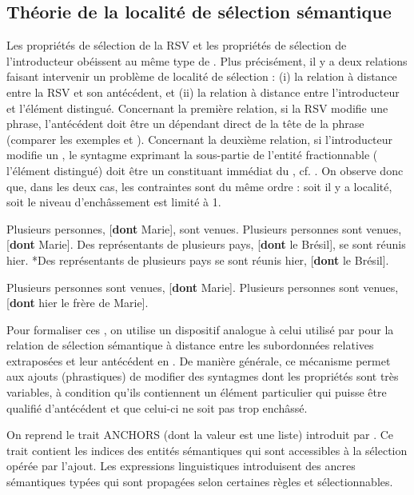 \subsection{Théorie de la localité de sélection sémantique}\label{ch3:sect3.5.4}

Les propriétés de sélection de la RSV et les propriétés de sélection de l’introducteur obéissent au même type de . Plus précisément, il y a deux relations faisant intervenir un problème de localité de sélection : (i) la relation à distance entre la RSV et son antécédent, et (ii) la relation à distance entre l’introducteur et l’élément distingué. Concernant la première relation, si la RSV modifie une phrase, l’antécédent doit être un dépendant direct de la tête de la phrase (comparer les exemples  et ). Concernant la deuxième relation, si l’introducteur modifie un , le syntagme exprimant la sous-partie de l’entité fractionnable ({\cad} l’élément distingué) doit être un constituant immédiat du , cf. . On observe donc que, dans les deux cas, les contraintes sont du même ordre : soit il y a localité, soit le niveau d’enchâssement est limité à 1.

\ea \label{ch3:ex134}
\ea 
Plusieurs personnes, [\textbf{dont} Marie], sont venues. \label{ch3:ex134a} 
\ex
Plusieurs personnes sont venues, [\textbf{dont} Marie]. \label{ch3:ex134b}
\ex 
Des représentants de plusieurs pays, [\textbf{dont} le Brésil], se sont réunis hier. \label{ch3:ex134c}
\ex 
*Des représentants de plusieurs pays se sont réunis hier, [\textbf{dont} le Brésil]. \label{ch3:ex134d}
\z 
\z

\ea \label{ch3:ex135} 
\ea 
Plusieurs personnes sont venues, [\textbf{dont} Marie]. 
\ex 
Plusieurs personnes sont venues, [\textbf{dont} hier le frère de Marie].
\z 
\z 

Pour formaliser ces , on utilise un dispositif analogue à celui utilisé par \citet{Kiss2005} pour la relation de sélection sémantique à distance entre les subordonnées relatives extraposées et leur antécédent en . De manière générale, ce mécanisme permet aux ajouts (phrastiques) de modifier des syntagmes dont les propriétés sont très variables, à condition qu’ils contiennent un élément particulier qui puisse être qualifié d’antécédent et que celui-ci ne soit pas trop enchâssé. 

On reprend le trait ANCHORS (dont la valeur est une liste) introduit par \citet{Kiss2005}. Ce trait contient les indices des entités sémantiques qui sont accessibles à la sélection opérée par l’ajout. Les expressions linguistiques introduisent des ancres sémantiques typées qui sont propagées selon certaines règles et sélectionnables. 


